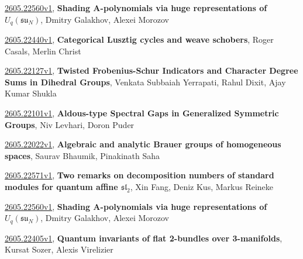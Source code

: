\documentclass[9pt, a4paper]{article}
\theoremstyle{plain}
\theoremstyle{definition}
\theoremstyle{remark}
\newcommand{\arxiv}[3]{\href{https://arxiv.org/abs/#1}{#1}, \textbf{\textcolor{arxivblue}{#2}}, #3}
\begin{document}
\arxiv{2605.22560v1}{Shading A-polynomials via huge representations of $U_q(\mathfrak{su}_N)$}{Dmitry Galakhov, Alexei Morozov}

\arxiv{2605.22440v1}{Categorical Lusztig cycles and weave schobers}{Roger Casals, Merlin Christ}

\arxiv{2605.22127v1}{Twisted Frobenius-Schur Indicators and Character Degree Sums in Dihedral Groups}{Venkata Subbaiah Yerrapati, Rahul Dixit, Ajay Kumar Shukla}

\arxiv{2605.22101v1}{Aldous-type Spectral Gaps in Generalized Symmetric Groups}{Niv Levhari, Doron Puder}

\arxiv{2605.22022v1}{Algebraic and analytic Brauer groups of homogeneous spaces}{Saurav Bhaumik, Pinakinath Saha}

\arxiv{2605.22571v1}{Two remarks on decomposition numbers of standard modules for quantum affine $\mathfrak{sl}_2$}{Xin Fang, Deniz Kus, Markus Reineke}

\arxiv{2605.22560v1}{Shading A-polynomials via huge representations of $U_q(\mathfrak{su}_N)$}{Dmitry Galakhov, Alexei Morozov}

\arxiv{2605.22405v1}{Quantum invariants of flat 2-bundles over 3-manifolds}{Kursat Sozer, Alexis Virelizier}

\end{document}
